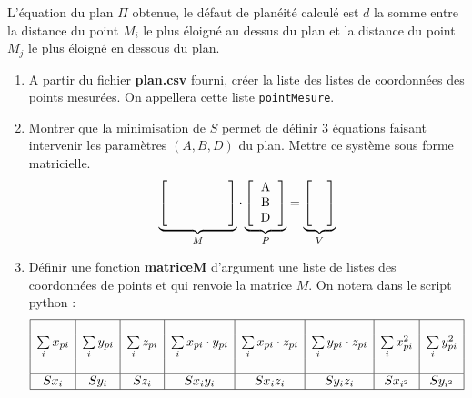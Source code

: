 \documentclass[10pt,fleqn]{article} %
\begin{document}
L'équation du plan $\Pi$ obtenue, le défaut de planéité calculé est $d$ la somme entre la distance du point $M_i$ le plus éloigné au dessus du plan et la distance du point $M_j$ le plus éloigné en dessous du plan.
\\
 
\begin{enumerate}
\item A partir du fichier \textbf{plan.csv} fourni, créer la liste des listes de coordonnées des points mesurées. On appellera cette liste \texttt{pointMesure}.
\item Montrer que la minimisation de $S$ permet de définir 3 équations faisant intervenir les paramètres $(A,B,D)$ du plan. Mettre ce système sous forme matricielle.
$$
\underbrace{\left[
\begin{tabular}{cccc} 
& & & \\
& & & \\
& & & \\
\end{tabular}
\right]}_{M}
\cdot 
\underbrace{
\left[
\begin{tabular}{cccc} 
A \\
B \\
D \\
\end{tabular}
\right]}_{P}
=
\underbrace{
\left[
\begin{tabular}{cccc} 
 \\
 \\
 \\
\end{tabular}
\right]}_{V}
$$
\item Définir une fonction \textbf{matriceM} d'argument une liste de listes des coordonnées de points et qui renvoie la matrice $M$.
On notera dans le script python :
$$
\begin{array}{|c|c|c|c|c|c|c|c|}
\hline
 & & & & & & & \\
\sum\limits_i x_{pi} & 
\sum\limits_i y_{pi} & 
\sum\limits_i z_{pi} & 
\sum\limits_i x_{pi}\cdot y_{pi}  & 
\sum\limits_i x_{pi}\cdot z_{pi}  & 
\sum\limits_i y_{pi}\cdot z_{pi}  & 
\sum\limits_i x_{pi}^2 & 
\sum\limits_i y_{pi}^2 \\
 & & & & & & & \\
\hline 
Sx_i & Sy_i & Sz_i&  Sx_iy_i & Sx_iz_i & Sy_i z_i  & Sx_{i^2}& Sy_{i^2} \\
\hline
\end{array}
$$


\end{enumerate}
\end{document}
